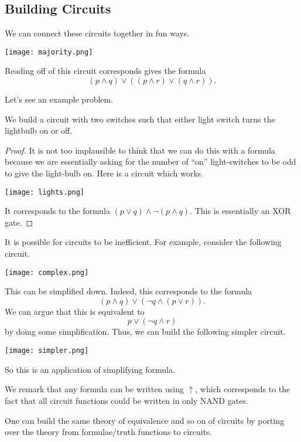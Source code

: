 \subsection{Building Circuits}
We can connect these circuits together in fun ways.
\begin{center}
	\texttt{[image: majority.png]}
\end{center}
Reading off of this circuit corresponds gives the formula
\[(p\land q)\lor((p\land r)\lor(q\land r)).\]

Let's see an example problem.
\begin{exe}
	We build a circuit with two switches such that either light switch turns the lightbulb on or off.
\end{exe}
\begin{proof}
	It is not too implausible to think that we can do this with a formula because we are essentially asking for the number of ``on'' light-switches to be odd to give the light-bulb on. Here is a circuit which works.
	\begin{center}
		\texttt{[image: lights.png]}
	\end{center}
	It corresponds to the formula $(p\lor q)\land\lnot(p\land q)$. This is essentially an XOR gate.
\end{proof}
It is possible for circuits to be inefficient. For example, consider the following circuit.
\begin{center}
	\texttt{[image: complex.png]}
\end{center}
This can be simplified down. Indeed, this corresponds to the formula
\[(p\land q)\lor(\lnot q\land(p\lor r)).\]
We can argue that this is equivalent to
\[p\lor(\lnot q\land r)\]
by doing some simplification. Thus, we can build the following simpler circuit.
\begin{center}
	\texttt{[image: simpler.png]}
\end{center}
So this is an application of simplifying formula.
\begin{remark}
	We remark that any formula can be written using $\uparrow$, which corresponds to the fact that all circuit functions could be written in only NAND gates.
\end{remark}
\begin{remark}
	One can build the same theory of equivalence and so on of circuits by porting over the theory from formulae/truth functions to circuits.
\end{remark}